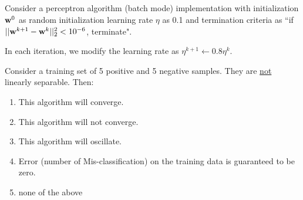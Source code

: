 \begin{frame}
\section{}
  Consider a perceptron algorithm (batch mode) implementation with initialization ${\bf w}^0$ as random initialization learning rate $\eta $ as 0.1 and termination criteria as ``if $||{\bf w}^{k+1} - {\bf w}^k||_2^2 <10^{-6}$, terminate".

  In each iteration, we modify the learning rate as $\eta^{k+1} \leftarrow 0.8 \eta^k$.

  Consider a training set of 5 positive and 5 negative samples. They are \underline{not} linearly separable.
  Then:
    \begin{enumerate}[label=(\Alph*)]
     \item This algorithm will converge.    %
     \item This algorithm will not converge.
     \item This algorithm will oscillate.
     \item Error (number of Mis-classification) on the training data is guaranteed to be zero.
     \item none of the above    %
    \end{enumerate}
\end{frame}

